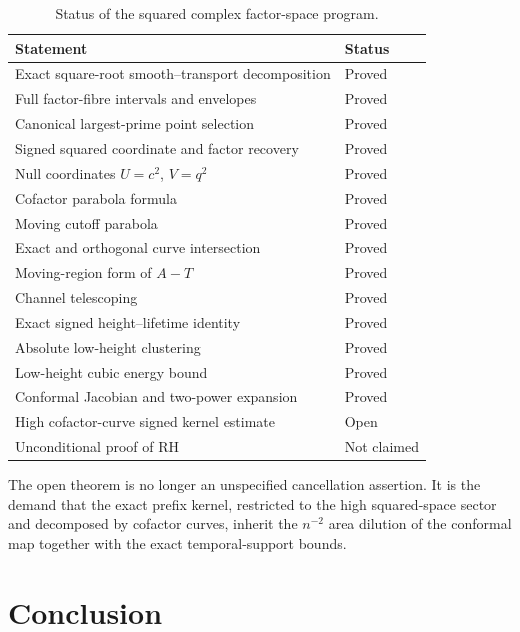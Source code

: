 \documentclass[11pt]{article}
\theoremstyle{definition}
\theoremstyle{remark}
\newcommand{\1}{\mathbf{1}}
\begin{document}
\begin{table}[htbp]
\centering
\caption{Status of the squared complex factor-space program.}
\label{tab:status}
\renewcommand{\arraystretch}{1.25}
\begin{tabular}{>{\raggedright\arraybackslash}p{} >{\centering\arraybackslash}p{}}
\toprule
Statement & Status\\
\midrule
Exact square-root smooth--transport decomposition & Proved\\
Full factor-fibre intervals and envelopes & Proved\\
Canonical largest-prime point selection & Proved\\
Signed squared coordinate and factor recovery & Proved\\
Null coordinates $U=c^2$, $V=q^2$ & Proved\\
Cofactor parabola formula & Proved\\
Moving cutoff parabola & Proved\\
Exact and orthogonal curve intersection & Proved\\
Moving-region form of $A-T$ & Proved\\
Channel telescoping & Proved\\
Exact signed height--lifetime identity & Proved\\
Absolute low-height clustering & Proved\\
Low-height cubic energy bound & Proved\\
Conformal Jacobian and two-power expansion & Proved\\
High cofactor-curve signed kernel estimate & Open\\
Unconditional proof of RH & Not claimed\\
\bottomrule
\end{tabular}
\end{table}

The open theorem is no longer an unspecified cancellation assertion.  It is the demand that the exact prefix kernel, restricted to the high squared-space sector and decomposed by cofactor curves, inherit the $n^{-2}$ area dilution of the conformal map together with the exact temporal-support bounds.

\section{Conclusion}
\label{sec:conclusion}
\end{document}
